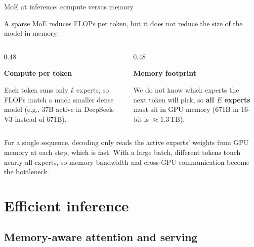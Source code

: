 \documentclass[11pt,aspectratio=169]{beamer}
\begin{document}
\begin{frame}{MoE at inference: compute versus memory}
    \setlength{\parskip}{6pt}

    A sparse MoE reduces FLOPs per token, but it does not reduce the size of
    the model in memory:

    \begin{columns}[T,onlytextwidth]
        \begin{column}{0.48\textwidth}
            \begin{tcolorbox}[nndsgreen,courseheight={moe-inf}{0.30\textheight}]\small
                \textbf{\color{darkgreen}Compute per token}\par
                Each token runs only $k$ experts, so FLOPs match a much
                smaller dense model (e.g., $37$B active in DeepSeek-V3 instead
                of $671$B).
            \end{tcolorbox}
        \end{column}
        \begin{column}{0.48\textwidth}
            \begin{tcolorbox}[nndsorange,courseheight={moe-inf}{0.30\textheight}]\small
                \textbf{\color{draworange}Memory footprint}\par
                We do not know which experts the next token will pick, so
                \textbf{all $E$ experts} must sit in GPU memory ($671$B in
                16-bit is $\approx 1.3$\,TB).
            \end{tcolorbox}
        \end{column}
    \end{columns}

    \medskip
    For a single sequence, decoding only reads the active experts' weights
    from GPU memory at each step, which is fast. With a large batch,
    different tokens touch nearly all experts, so memory bandwidth and
    cross-GPU communication become the bottleneck.


\end{frame}

\section{Efficient inference}
\subsection{Memory-aware attention and serving}
\end{document}

